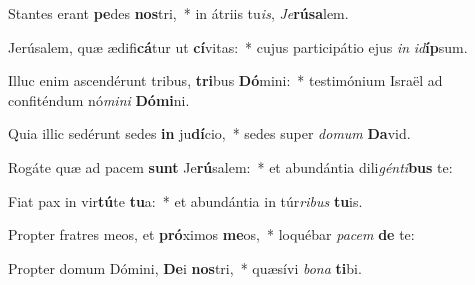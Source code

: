 \item Stantes erant \textbf{pe}des \textbf{nos}tri,~* in átriis tu\textit{is}, \textit{Je}\textbf{rú}\textbf{sa}lem.
\item Jerúsalem, quæ ædifi\textbf{cá}tur ut \textbf{cí}vitas:~* cujus participátio ejus \textit{in} \textit{id}\textbf{íp}sum.
\item Illuc enim ascendérunt tribus, \textbf{tri}bus \textbf{Dó}mini:~* testimónium Israël ad confiténdum nó\textit{mi}\textit{ni} \textbf{Dó}\textbf{mi}ni.
\item Quia illic sedérunt sedes \textbf{in} ju\textbf{dí}cio,~* sedes super \textit{do}\textit{mum} \textbf{Da}vid.
\item Rogáte quæ ad pacem \textbf{sunt} Je\textbf{rú}salem:~* et abundántia dili\textit{gén}\textit{ti}\textbf{bus} te:
\item Fiat pax in vir\textbf{tú}te \textbf{tu}a:~* et abundántia in túr\textit{ri}\textit{bus} \textbf{tu}is.
\item Propter fratres meos, et \textbf{pró}ximos \textbf{me}os,~* loquébar \textit{pa}\textit{cem} \textbf{de} te:
\item Propter domum Dómini, \textbf{De}i \textbf{nos}tri,~* quæsívi \textit{bo}\textit{na} \textbf{ti}bi.
